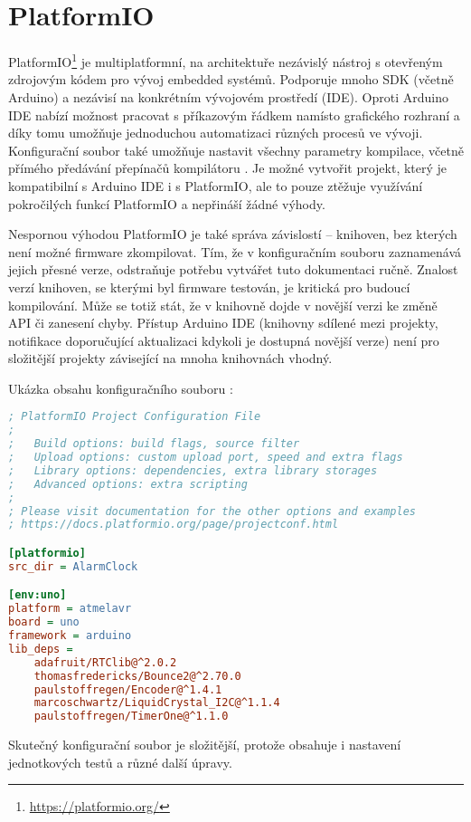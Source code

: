 \section{PlatformIO}
PlatformIO\footnote{\url{https://platformio.org/}} je multiplatformní, na
architektuře nezávislý nástroj s otevřeným zdrojovým kódem pro vývoj embedded
systémů. Podporuje mnoho SDK (včetně Arduino) a nezávisí na konkrétním
vývojovém prostředí (IDE). Oproti Arduino IDE nabízí možnost pracovat
s příkazovým řádkem namísto grafického rozhraní a díky tomu umožňuje
jednoduchou automatizaci různých procesů ve vývoji. Konfigurační soubor
 také umožňuje nastavit všechny parametry kompilace,
včetně přímého předávání přepínačů kompilátoru . Je možné
vytvořit projekt, který je kompatibilní s Arduino IDE i s PlatformIO, ale to
pouze ztěžuje využívání pokročilých funkcí PlatformIO a nepřináší žádné výhody.

Nespornou výhodou PlatformIO je také správa závislostí -- knihoven, bez kterých
není možné firmware zkompilovat. Tím, že v konfiguračním souboru
 zaznamenává jejich přesné verze, odstraňuje potřebu
vytvářet tuto dokumentaci ručně. Znalost verzí knihoven, se kterými byl
firmware testován, je kritická pro budoucí kompilování. Může se totiž stát, že
v knihovně dojde v novější verzi ke změně API či zanesení chyby. Přístup
Arduino IDE (knihovny sdílené mezi projekty, notifikace doporučující
aktualizaci kdykoli je dostupná novější verze) není pro složitější projekty
závisející na mnoha knihovnách vhodný.

Ukázka obsahu konfiguračního souboru :
\begin{lstlisting}[language=Ini]
; PlatformIO Project Configuration File
;
;   Build options: build flags, source filter
;   Upload options: custom upload port, speed and extra flags
;   Library options: dependencies, extra library storages
;   Advanced options: extra scripting
;
; Please visit documentation for the other options and examples
; https://docs.platformio.org/page/projectconf.html

[platformio]
src_dir = AlarmClock

[env:uno]
platform = atmelavr
board = uno
framework = arduino
lib_deps = 
	adafruit/RTClib@^2.0.2
	thomasfredericks/Bounce2@^2.70.0
	paulstoffregen/Encoder@^1.4.1
	marcoschwartz/LiquidCrystal_I2C@^1.1.4
	paulstoffregen/TimerOne@^1.1.0
\end{lstlisting}
Skutečný konfigurační soubor je složitější, protože obsahuje i nastavení
jednotkových testů a různé další úpravy.

